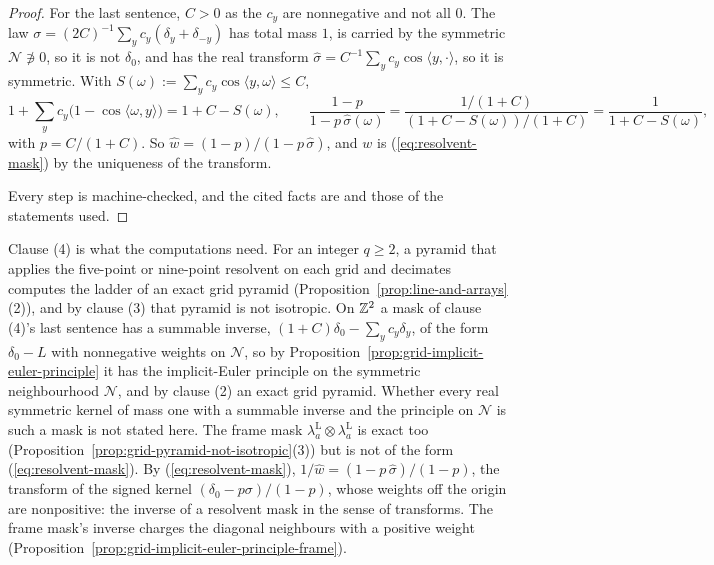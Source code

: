 \begin{proof}
For the last sentence, $C > 0$ as the $c_y$ are nonnegative and not all $0$. The law
$\sigma = (2C)^{-1}\sum_yc_y(\delta_y + \delta_{-y})$ has total mass $1$, is carried by the
symmetric $\mathcal{N} \not\ni 0$, so it is not $\delta_0$, and has the real transform
$\widehat{\sigma} = C^{-1}\sum_yc_y\cos\langle y, \cdot\rangle$, so it is symmetric. With
$S(\omega) := \sum_yc_y\cos\langle y, \omega\rangle \le C$,
\[
1 + \sum_yc_y\bigl(1 - \cos\langle\omega, y\rangle\bigr) = 1 + C - S(\omega) ,\qquad
\frac{1 - p}{1 - p\,\widehat{\sigma}(\omega)} = \frac{1/(1+C)}{(1 + C - S(\omega))/(1 + C)}
= \frac{1}{1 + C - S(\omega)} ,
\]
with $p = C/(1+C)$. So $\widehat{w} = (1 - p)/(1 - p\,\widehat{\sigma})$, and $w$ is
(\ref{eq:resolvent-mask}) by the uniqueness of the transform.

Every step is machine-checked, and the cited facts are  and those of the statements
used.
\end{proof}


Clause (4) is what the computations need. For an integer $q \ge 2$, a pyramid that applies the
five-point or nine-point resolvent on each grid and decimates computes the ladder of an exact grid
pyramid (Proposition~\ref{prop:line-and-arrays}(2)), and by clause (3) that pyramid is not
isotropic. On $\mathbb{Z}^2$ a mask of clause (4)'s last sentence has a summable inverse,
$(1 + C)\delta_0 - \sum_yc_y\delta_y$, of the form $\delta_0 - L$ with nonnegative weights on
$\mathcal{N}$, so by Proposition~\ref{prop:grid-implicit-euler-principle} it has the implicit-Euler
principle on the symmetric neighbourhood $\mathcal{N}$, and by clause (2) an exact grid pyramid.
Whether every real symmetric kernel of mass one with a summable inverse and the principle on
$\mathcal{N}$ is such a mask is not stated here. The frame mask
$\lambda^{\mathrm L}_a \otimes \lambda^{\mathrm L}_a$ is exact too
(Proposition~\ref{prop:grid-pyramid-not-isotropic}(3)) but is not of the form
(\ref{eq:resolvent-mask}). By (\ref{eq:resolvent-mask}),
$1/\widehat w = (1 - p\,\widehat\sigma)/(1 - p)$, the transform of the signed kernel
$(\delta_0 - p\sigma)/(1-p)$, whose weights off the origin are nonpositive: the inverse of a resolvent
mask in the sense of transforms. The frame mask's inverse
charges the diagonal neighbours with a positive weight
(Proposition~\ref{prop:grid-implicit-euler-principle-frame}).

